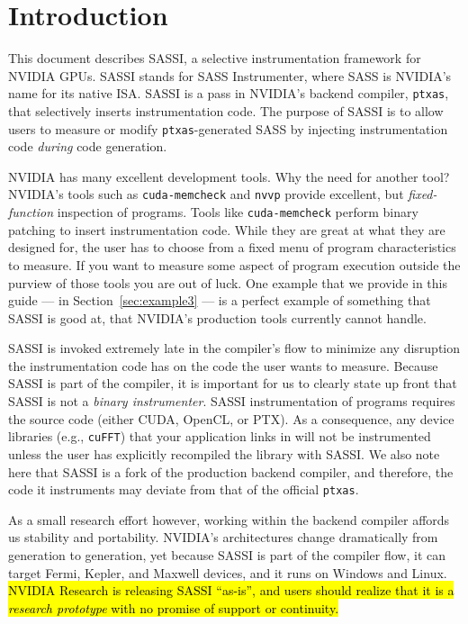 \section{Introduction}

This document describes SASSI, a selective instrumentation framework
for NVIDIA GPUs.  SASSI stands for SASS Instrumenter, where SASS is
NVIDIA's name for its native ISA.  SASSI is a pass in NVIDIA's backend
compiler, \texttt{ptxas}, that selectively inserts instrumentation
code.  The purpose of SASSI is to allow users to measure or modify
\texttt{ptxas}-generated SASS by injecting instrumentation code
\emph{during} code generation.

NVIDIA has many excellent development tools. Why the need for another
tool? NVIDIA's tools such as \texttt{cuda-memcheck} and \texttt{nvvp}
provide excellent, but \emph{fixed-function} inspection of programs.
Tools like \texttt{cuda-memcheck} perform binary patching to insert
instrumentation code.  While they are great at what they are designed
for, the user has to choose from a fixed menu of program
characteristics to measure.  If you want to measure some aspect of
program execution outside the purview of those tools you are out of
luck.  One example that we provide in this guide --- in
Section~\ref{sec:example3} --- is a perfect example of something
that SASSI is good at, that NVIDIA's production tools currently cannot
handle.

SASSI is invoked extremely late in the compiler's flow to minimize any
disruption the instrumentation code has on the code the user wants to
measure. Because SASSI is part of the compiler, it is important for us
to clearly state up front that SASSI is not a \emph{binary
  instrumenter}. SASSI instrumentation of programs requires the source
code (either CUDA, OpenCL, or PTX). As a consequence, any device
libraries (e.g., \texttt{cuFFT}) that your application links in will
not be instrumented unless the user has explicitly recompiled the
library with SASSI. We also note here that SASSI is a fork of the
production backend compiler, and therefore, the code it instruments
may deviate from that of the official \texttt{ptxas}. 

As a small research effort however, working within the backend
compiler affords us stability and portability.  NVIDIA's architectures
change dramatically from generation to generation, yet because SASSI
is part of the compiler flow, it can target Fermi, Kepler, and Maxwell
devices, and it runs on Windows and Linux.  \hl{NVIDIA Research is
  releasing SASSI ``as-is'', and users should realize that it is a
  \emph{research prototype} with no promise of support or continuity.}
